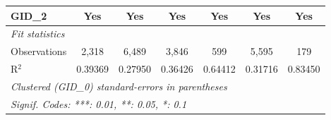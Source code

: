 \begin{tabular}{lcccccc}
   GID\_2                             & Yes      & Yes           & Yes            & Yes          & Yes      & Yes\\  
   \midrule
   \emph{Fit statistics}\\
   Observations                       & 2,318    & 6,489         & 3,846          & 599          & 5,595    & 179\\  
   R$^2$                              & 0.39369  & 0.27950       & 0.36426        & 0.64412      & 0.31716  & 0.83450\\  
   \midrule \midrule
   \multicolumn{7}{l}{\emph{Clustered (GID\_0) standard-errors in parentheses}}\\
   \multicolumn{7}{l}{\emph{Signif. Codes: ***: 0.01, **: 0.05, *: 0.1}}\\
\end{tabular}
\par\endgroup



